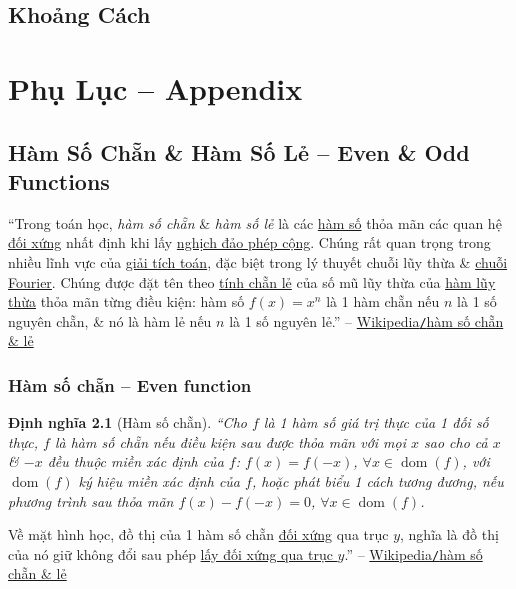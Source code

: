 \documentclass[oneside]{book}
\numberwithin{equation}{section}
\newtheorem{dinhnghia}{Định nghĩa}[section]
\begin{document}
\section{Khoảng Cách}


\appendix

\chapter{Phụ Lục -- Appendix}

\section{Hàm Số Chẵn \& Hàm Số Lẻ -- Even \& Odd Functions}
\label{sect: even & odd functions}
``Trong toán học, \textit{hàm số chẵn} \& \textit{hàm số lẻ} là các \href{https://vi.wikipedia.org/wiki/H%C3%A0m_s%E1%BB%91}{hàm số} thỏa mãn các quan hệ \href{https://vi.wikipedia.org/wiki/%C4%90%E1%BB%91i_x%E1%BB%A9ng}{đối xứng} nhất định khi lấy \href{https://vi.wikipedia.org/wiki/Ngh%E1%BB%8Bch_%C4%91%E1%BA%A3o_ph%C3%A9p_c%E1%BB%99ng}{nghịch đảo phép cộng}. Chúng rất quan trọng trong nhiều lĩnh vực của \href{https://vi.wikipedia.org/wiki/Gi%E1%BA%A3i_t%C3%ADch_to%C3%A1n}{giải tích toán}, đặc biệt trong lý thuyết chuỗi lũy thừa \& \href{https://vi.wikipedia.org/wiki/Chu%E1%BB%97i_Fourier}{chuỗi Fourier}. Chúng được đặt tên theo \href{https://vi.wikipedia.org/wiki/T%C3%ADnh_ch%E1%BA%B5n_l%E1%BA%BB}{tính chẵn lẻ} của số mũ lũy thừa của \href{https://vi.wikipedia.org/wiki/L%C5%A9y_th%E1%BB%ABa}{hàm lũy thừa} thỏa mãn từng điều kiện: hàm số $f(x) = x^n$ là 1 hàm chẵn nếu $n$ là 1 số nguyên chẵn, \& nó là hàm lẻ nếu $n$ là 1 số nguyên lẻ.'' -- \href{https://vi.wikipedia.org/wiki/H%C3%A0m_s%E1%BB%91_ch%E1%BA%B5n_v%C3%A0_l%E1%BA%BB}{Wikipedia\texttt{/}hàm số chẵn \& lẻ}

\subsection{Hàm số chẵn -- Even function}

\begin{dinhnghia}[Hàm số chẵn]
	``Cho $f$ là 1 hàm số giá trị thực của 1 đối số thực, $f$ là \emph{hàm số chẵn} nếu điều kiện sau được thỏa mãn với mọi $x$ sao cho cả $x$ \& $-x$ đều thuộc miền xác định của $f$: $f(x) = f(-x)$, $\forall x\in\operatorname{dom}(f)$, với $\operatorname{dom}(f)$ ký hiệu miền xác định của $f$, hoặc phát biểu 1 cách tương đương, nếu phương trình sau thỏa mãn $f(x) - f(-x) = 0$, $\forall x\in\operatorname{dom}(f)$.
\end{dinhnghia}
Về mặt hình học, đồ thị của 1 hàm số chẵn \href{https://vi.wikipedia.org/wiki/%C4%90%E1%BB%91i_x%E1%BB%A9ng}{đối xứng} qua trục $y$, nghĩa là đồ thị của nó giữ không đổi sau phép \href{https://vi.wikipedia.org/wiki/%C4%90%E1%BB%91i_x%E1%BB%A9ng_tr%E1%BB%A5c}{lấy đối xứng qua trục $y$}.'' -- \href{https://vi.wikipedia.org/wiki/H%C3%A0m_s%E1%BB%91_ch%E1%BA%B5n_v%C3%A0_l%E1%BA%BB}{Wikipedia\texttt{/}hàm số chẵn \& lẻ}
\end{document}
